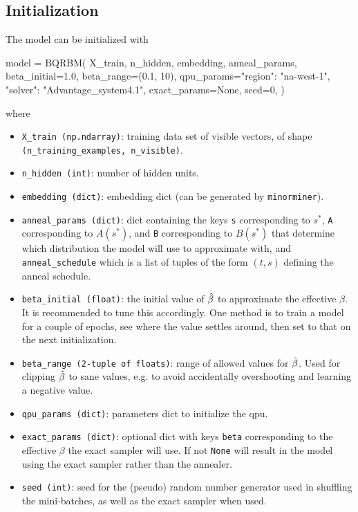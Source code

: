 \subsection{Initialization}
The model can be initialized with
\begin{python}
model = BQRBM(
    X_train,
    n_hidden,
    embedding,
    anneal_params,
    beta_initial=1.0,
    beta_range=(0.1, 10),
    qpu_params={"region": "na-west-1", "solver": "Advantage_system4.1"},
    exact_params=None,
    seed=0,
)
\end{python}
where
\begin{itemize}
    \item \texttt{X\_train (np.ndarray)}: training data set of visible vectors, of shape \newline\texttt{(n\_training\_examples, n\_visible)}.
    \item \texttt{n\_hidden (int)}: number of hidden units.
    \item \texttt{embedding (dict)}: embedding dict (can be generated by \texttt{minorminer}).
    \item \texttt{anneal\_params (dict)}: dict containing the keys \texttt{s} corresponding to \( s^* \), \texttt{A} corresponding to \( A(s^*) \), and \texttt{B} corresponding to \( B(s^*) \) that determine which distribution the model will use to approximate with, and \texttt{anneal\_schedule} which is a list of tuples of the form \( (t, s) \) defining the anneal schedule.
    \item \texttt{beta\_initial (float)}: the initial value of \( \hat{\beta} \) to approximate the effective \( \beta \). It is recommended to tune this accordingly. One method is to train a model for a couple of epochs, see where the value settles around, then set to that on the next initialization.
    \item \texttt{beta\_range (2-tuple of floats)}: range of allowed values for \( \hat{\beta} \). Used for clipping \( \hat{\beta} \) to sane values, e.g. to avoid accidentally overshooting and learning a negative value.
    \item \texttt{qpu\_params (dict)}: parameters dict to initialize the qpu.
    \item \texttt{exact\_params (dict)}: optional dict with keys \texttt{beta} corresponding to the effective \( \beta \) the exact sampler will use. If not \texttt{None} will result in the model using the exact sampler rather than the annealer.
    \item \texttt{seed (int)}: seed for the (pseudo) random number generator used in shuffling the mini-batches, as well as the exact sampler when used.
\end{itemize}

